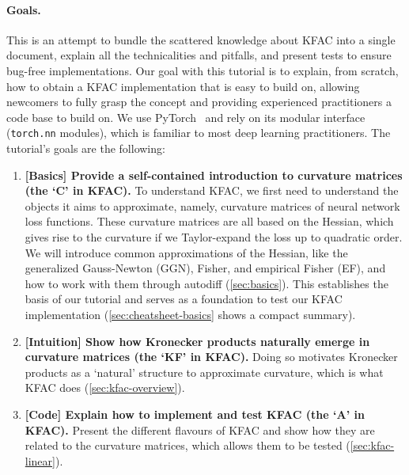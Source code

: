 \paragraph{Goals.}
This is an attempt to bundle the scattered knowledge about KFAC into a single document, explain all the technicalities and pitfalls, and present tests to ensure bug-free implementations.
Our goal with this tutorial is to explain, from scratch, how to obtain a KFAC implementation that is easy to build on, allowing newcomers to fully grasp the concept and providing experienced practitioners a code base to build on.
We use PyTorch~\cite{paszke2019pytorch} and rely on its modular interface (\texttt{torch.nn} modules), which is familiar to most deep learning practitioners.
The tutorial's goals are the following:
\begin{enumerate}
\item \textbf{[Basics] Provide a self-contained introduction to curvature matrices (the `C' in KFAC).}
  To understand KFAC, we first need to understand the objects it aims to approximate, namely, curvature matrices of neural network loss functions.
  These curvature matrices are all based on the Hessian, which gives rise to the curvature if we Taylor-expand the loss up to quadratic order.
  We will introduce common approximations of the Hessian, like the generalized Gauss-Newton (GGN), Fisher, and empirical Fisher (EF), and how to work with them through autodiff (\cref{sec:basics}).
  This establishes the basis of our tutorial and serves as a foundation to test our KFAC implementation (\cref{sec:cheatsheet-basics} shows a compact summary).

\item \textbf{[Intuition] Show how Kronecker products naturally emerge in curvature matrices (the `KF' in KFAC).}
  Doing so motivates Kronecker products as a `natural' structure to approximate curvature, which is what KFAC does (\cref{sec:kfac-overview}).

\item \textbf{[Code] Explain how to implement and test KFAC (the `A' in KFAC).}
  Present the different flavours of KFAC and show how they are related to the curvature matrices, which allows them to be tested (\cref{sec:kfac-linear}).
\end{enumerate}
